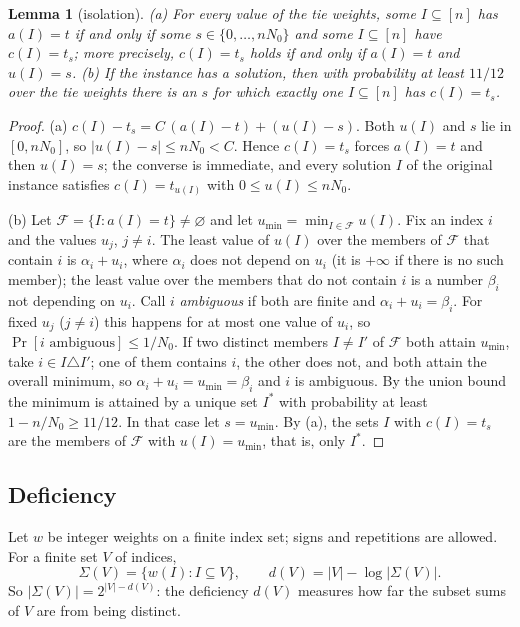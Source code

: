 \documentclass[11pt]{article}
\newtheorem{lemma}{Lemma}[section]
\theoremstyle{definition}
\newcommand{\abs}[1]{\lvert #1\rvert}
\begin{document}
\begin{lemma}[isolation]\label{lem:iso}
\textup{(a)} For every value of the tie weights, some $I\subseteq[n]$ has $a(I)=t$ if and only if some
$s\in\{0,\dots,nN_0\}$ and some $I\subseteq[n]$ have $c(I)=t_s$; more precisely, $c(I)=t_s$ holds if and only if
$a(I)=t$ and $u(I)=s$.
\textup{(b)} If the instance has a solution, then with probability at least $11/12$ over the tie weights there is an
$s$ for which exactly one $I\subseteq[n]$ has $c(I)=t_s$.
\end{lemma}
\begin{proof}
(a) $c(I)-t_s=C\,(a(I)-t)+(u(I)-s)$. Both $u(I)$ and $s$ lie in $[0,nN_0]$, so $\abs{u(I)-s}\le nN_0<C$. Hence
$c(I)=t_s$ forces $a(I)=t$ and then $u(I)=s$; the converse is immediate, and every solution $I$ of the original
instance satisfies $c(I)=t_{u(I)}$ with $0\le u(I)\le nN_0$.

(b) Let $\mathcal F=\{I:a(I)=t\}\ne\varnothing$ and let $u_{\min}=\min_{I\in\mathcal F}u(I)$. Fix an index $i$ and the
values $u_j$, $j\ne i$. The least value of $u(I)$ over the members of $\mathcal F$ that contain $i$ is $\alpha_i+u_i$,
where $\alpha_i$ does not depend on $u_i$ (it is $+\infty$ if there is no such member); the least value over the
members that do not contain $i$ is a number $\beta_i$ not depending on $u_i$. Call $i$ \emph{ambiguous} if both are
finite and $\alpha_i+u_i=\beta_i$. For fixed $u_j$ ($j\ne i$) this happens for at most one value of $u_i$, so
$\Pr[i\text{ ambiguous}]\le1/N_0$. If two distinct members $I\ne I'$ of $\mathcal F$ both attain $u_{\min}$, take
$i\in I\triangle I'$; one of them contains $i$, the other does not, and both attain the overall minimum, so
$\alpha_i+u_i=u_{\min}=\beta_i$ and $i$ is ambiguous. By the union bound the minimum is attained by a unique set
$I^\ast$ with probability at least $1-n/N_0\ge11/12$. In that case let $s=u_{\min}$. By (a), the sets $I$ with
$c(I)=t_s$ are the members of $\mathcal F$ with $u(I)=u_{\min}$, that is, only $I^\ast$.
\end{proof}

\subsection{Deficiency}
Let $w$ be integer weights on a finite index set; signs and repetitions are allowed. For a finite set $V$ of
indices,
\begin{equation}\label{eq:def}
 \Sigma(V)=\{w(I):I\subseteq V\},\qquad d(V)=\abs V-\log\abs{\Sigma(V)} .
\end{equation}
So $\abs{\Sigma(V)}=2^{\abs V-d(V)}$: the deficiency $d(V)$ measures how far the subset sums of $V$ are from being
distinct.
\end{document}

